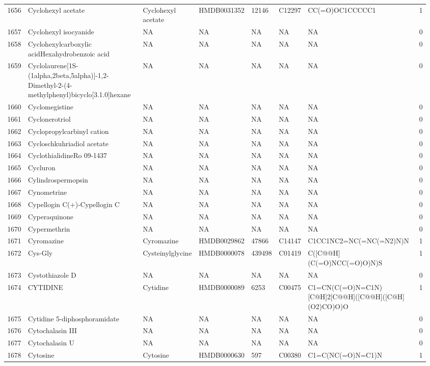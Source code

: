 \documentclass[a4paper]{article}
\begin{document}
\begin{longtable}{rlllllll}
  1656 & Cyclohexyl acetate & Cyclohexyl acetate & HMDB0031352 & 12146 & C12297 & CC(=O)OC1CCCCC1 & 1 \\ 
  1657 & Cyclohexyl isocyanide & NA & NA & NA & NA & NA & 0 \\ 
  1658 & Cyclohexylcarboxylic acidHexahydrobenzoic acid & NA & NA & NA & NA & NA & 0 \\ 
  1659 & Cyclolaurene[1S-(1alpha,2beta,5alpha)]-1,2-Dimethyl-2-(4-methylphenyl)bicyclo[3.1.0]hexane & NA & NA & NA & NA & NA & 0 \\ 
  1660 & Cyclomegistine & NA & NA & NA & NA & NA & 0 \\ 
  1661 & Cyclonerotriol & NA & NA & NA & NA & NA & 0 \\ 
  1662 & Cyclopropylcarbinyl cation & NA & NA & NA & NA & NA & 0 \\ 
  1663 & Cycloschkuhriadiol acetate & NA & NA & NA & NA & NA & 0 \\ 
  1664 & CyclothialidineRo 09-1437 & NA & NA & NA & NA & NA & 0 \\ 
  1665 & Cycluron & NA & NA & NA & NA & NA & 0 \\ 
  1666 & Cylindrospermopsin & NA & NA & NA & NA & NA & 0 \\ 
  1667 & Cynometrine & NA & NA & NA & NA & NA & 0 \\ 
  1668 & Cypellogin C(+)-Cypellogin C & NA & NA & NA & NA & NA & 0 \\ 
  1669 & Cyperaquinone & NA & NA & NA & NA & NA & 0 \\ 
  1670 & Cypermethrin & NA & NA & NA & NA & NA & 0 \\ 
  1671 & Cyromazine & Cyromazine & HMDB0029862 & 47866 & C14147 & C1CC1NC2=NC(=NC(=N2)N)N & 1 \\ 
  1672 & Cys-Gly & Cysteinylglycine & HMDB0000078 & 439498 & C01419 & C([C@@H](C(=O)NCC(=O)O)N)S & 1 \\ 
  1673 & Cystothiazole D & NA & NA & NA & NA & NA & 0 \\ 
  1674 & CYTIDINE & Cytidine & HMDB0000089 & 6253 & C00475 & C1=CN(C(=O)N=C1N)[C@H]2[C@@H]([C@@H]([C@H](O2)CO)O)O & 1 \\ 
  1675 & Cytidine 5-diphosphoramidate & NA & NA & NA & NA & NA & 0 \\ 
  1676 & Cytochalasin III & NA & NA & NA & NA & NA & 0 \\ 
  1677 & Cytochalasin U & NA & NA & NA & NA & NA & 0 \\ 
  1678 & Cytosine & Cytosine & HMDB0000630 & 597 & C00380 & C1=C(NC(=O)N=C1)N & 1 \\ 

\end{longtable}
\end{document}
